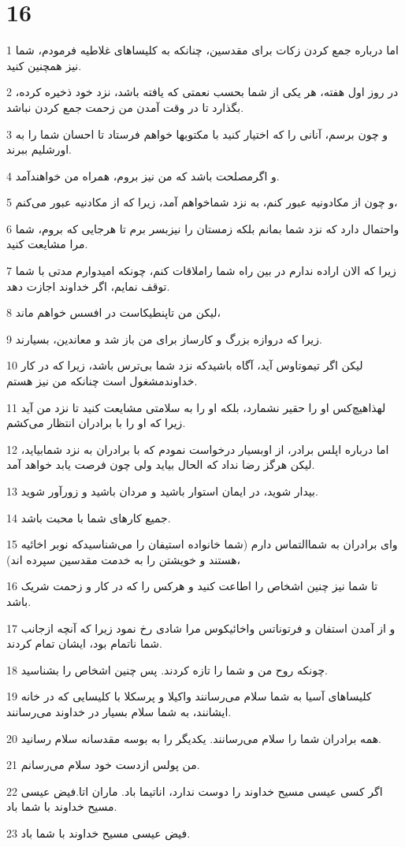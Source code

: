 \chapter{16}

\par 1 اما درباره جمع کردن زکات برای مقدسین، چنانکه به کلیساهای غلاطیه فرمودم، شما نیز همچنین کنید.
\par 2 در روز اول هفته، هر یکی از شما بحسب نعمتی که یافته باشد، نزد خود ذخیره کرده، بگذارد تا در وقت آمدن من زحمت جمع کردن نباشد.
\par 3 و چون برسم، آنانی را که اختیار کنید با مکتوبها خواهم فرستاد تا احسان شما را به اورشلیم ببرند.
\par 4 و اگرمصلحت باشد که من نیز بروم، همراه من خواهندآمد.
\par 5 و چون از مکادونیه عبور کنم، به نزد شماخواهم آمد، زیرا که از مکادنیه عبور می‌کنم،
\par 6 واحتمال دارد که نزد شما بمانم بلکه زمستان را نیزبسر برم تا هرجایی که بروم، شما مرا مشایعت کنید.
\par 7 زیرا که الان اراده ندارم در بین راه شما راملاقات کنم، چونکه امیدوارم مدتی با شما توقف نمایم، اگر خداوند اجازت دهد.
\par 8 لیکن من تاپنطیکاست در افسس خواهم ماند،
\par 9 زیرا که دروازه بزرگ و کارساز برای من باز شد و معاندین، بسیارند.
\par 10 لیکن اگر تیموتاوس آید، آگاه باشیدکه نزد شما بی‌ترس باشد، زیرا که در کار خداوندمشغول است چنانکه من نیز هستم.
\par 11 لهذاهیچ‌کس او را حقیر نشمارد، بلکه او را به سلامتی مشایعت کنید تا نزد من آید زیرا که او را با برادران انتظار می‌کشم.
\par 12 اما درباره اپلس برادر، از اوبسیار درخواست نمودم که با برادران به نزد شمابیاید، لیکن هرگز رضا نداد که الحال بیاید ولی چون فرصت یابد خواهد آمد.
\par 13 بیدار شوید، در ایمان استوار باشید و مردان باشید و زورآور شوید.
\par 14 جمیع کارهای شما با محبت باشد.
\par 15 و‌ای برادران به شماالتماس دارم (شما خانواده استیفان را می‌شناسیدکه نوبر اخائیه هستند و خویشتن را به خدمت مقدسین سپرده اند)،
\par 16 تا شما نیز چنین اشخاص را اطاعت کنید و هرکس را که در کار و زحمت شریک باشد.
\par 17 و از آمدن استفان و فرتوناتس واخائیکوس مرا شادی رخ نمود زیرا که آنچه ازجانب شما ناتمام بود، ایشان تمام کردند.
\par 18 چونکه روح من و شما را تازه کردند. پس چنین اشخاص را بشناسید.
\par 19 کلیساهای آسیا به شما سلام می‌رسانند واکیلا و پرسکلا با کلیسایی که در خانه ایشانند، به شما سلام بسیار در خداوند می‌رسانند.
\par 20 همه برادران شما را سلام می‌رسانند. یکدیگر را به بوسه مقدسانه سلام رسانید.
\par 21 من پولس ازدست خود سلام می‌رسانم.
\par 22 اگر کسی عیسی مسیح خداوند را دوست ندارد، اناتیما باد. ماران اتا.فیض عیسی مسیح خداوند با شما باد.
\par 23 فیض عیسی مسیح خداوند با شما باد.



